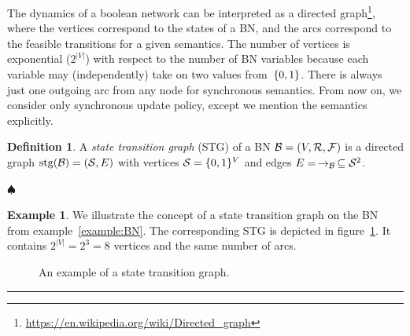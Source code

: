 \documentclass[
	digital, oneside, nosansbold, nocolorbold, nolot, nolof
]{fithesis4}
\theoremstyle{definition}
\newtheorem{definition}{Definition}
\theoremstyle{definition}
\newtheorem{example}{Example}
\newenvironment{ldefinition}
    {\begin{definition}}
	{\par\hspace{\stretch{1}}$\spadesuit$\hspace{\stretch{1}}
     \par\end{definition}}
\newenvironment{lexample}
    {\begin{example}}
    {\par\hspace{\stretch{1}}\rule{0.2\textwidth}{0.01ex}\hspace{\stretch{1}}
     \par\end{example}}
\DeclareMathOperator{\stg}{stg}
\DeclarePairedDelimiter{\set}{\{}{\}}
\begin{document}
The dynamics of a boolean network can be interpreted as a directed
graph\footnote{\url{https://en.wikipedia.org/wiki/Directed_graph}}, where the
vertices correspond to the states of a BN, and the arcs correspond to the
feasible transitions for a given semantics. The number of vertices is
exponential ($2^{|V|}$) with respect to the number of BN variables because each
variable may (independently) take on two values from~$\set{0, 1}$. There is
always just one outgoing arc from any node for synchronous semantics. From now
on, we consider only synchronous update policy, except we mention the semantics
explicitly.

\begin{ldefinition}
A \emph{state transition graph} (STG) of a BN $\mathcal{B} = (V, \mathcal{R},
\mathcal{F})$ is a directed graph $\stg(\BN{B}) = (\mathcal{S}, E)$ with
vertices $\mathcal{S} = \set{0, 1}^V$ and edges $E =\,
\to_{\mathcal{B}} \, \subseteq \mathcal{S}^2$.
\end{ldefinition}

\begin{lexample}
We illustrate the concept of a state transition graph on the BN from
example~\ref{example:BN}. The corresponding STG is depicted in
figure~\ref{fig:STG}. It contains $2^{|V|} = 2^3 = 8$ vertices and the same
number of arcs.
\begin{figure}[!ht]
\centering
{}
\caption[An example of a STG]{An example of a state transition graph.}
\label{fig:STG}
\end{figure}
\end{lexample}
\end{document}
